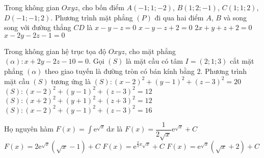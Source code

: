 \begin{ex}%
Trong không gian $Oxyz$, cho bốn điểm $A(-1;1;-2)$, $B(1;2;-1)$, $C(1;1;2)$, $D(-1;-1;2)$. Phương trình mặt phẳng $(P)$ đi qua hai điểm $A$, $B$ và song song với đường thẳng $CD$ là
\choice
{\True $x-y-z=0$}
{$x-y-z+2=0$}
{$2x+y+z+2=0$}
{$x-2y-2z-1=0$}
\end{ex}

\begin{ex}%
Trong không gian hệ trục tọa độ $O x y z$, cho mặt phẳng $(\alpha): x+2 y-2 z-10=0$. Gọi $(S)$ là mặt cầu có tâm $I=(2 ; 1 ; 3)$ cắt mặt phẳng $(\alpha)$ theo giao tuyến là đường tròn có bán kính bằng $2$. Phương trình mặt cầu $(S)$ tương ứng là
\choice
{\True$(S):(x-2)^{2}+(y-1)^{2}+(z-3)^{2}=20$}
{$(S):(x-2)^{2}+(y-1)^{2}+(z-3)^{2}=12$}
{$(S):(x+2)^{2}+(y+1)^{2}+(z+3)^{2}=12$}
{$(S):(x-2)^{2}+(y-1)^{2}+(z-3)^{2}=16$}
\end{ex}

\begin{ex}%
Họ nguyên hàm $F(x)=\displaystyle\int\mathrm{e}^{\sqrt{x}}\mathrm{\,d}x$ là
\choice
{$F(x)=\dfrac{1}{2\sqrt{x}}\mathrm{e}^{\sqrt{x}}+C$}
{\True $F(x)=2\mathrm{e}^{\sqrt{x}}\left(\sqrt{x}-1\right)+C$}
{$F(x)=\mathrm{e}^{\tfrac{2}{3}x\sqrt{x}}+C$}
{$F(x)=\mathrm{e}^{\sqrt{x}}\left(\sqrt{x}+2\right)+C$}
\end{ex}

